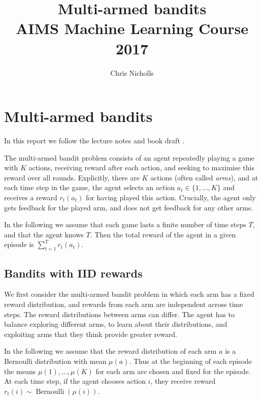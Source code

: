 \documentclass[10pt]{article}
\title{Multi-armed bandits \\ AIMS Machine Learning Course 2017}
\author{Chris Nicholls}
\DeclareMathOperator{\Bernoulli}{Bernoulli}
\begin{document}
\maketitle

\section{Multi-armed bandits}
In this report we follow the lecture notes \cite{Kanade} and book draft
\cite{Slivkins}.

The multi-armed bandit problem consists of an agent repeatedly playing a game
with $K$ actions, receiving reward after each action, and seeking to maximise
this reward over all rounds. Explicitly, there are $K$ actions (often called
\emph{arms}), and at each time step in the game, the agent selects an action
$a_t \in \{1, \ldots, K\}$ and receives a reward $r_t(a_t)$ for having played
this action. Crucially, the agent only gets feedback for the played arm, and
does not get feedback for any other arms.

In the following we assume that each game lasts a finite number of time steps
$T$, and that the agent knows $T$. Then the total reward of the agent in a given
episode is $\sum_{t=1}^T r_t(a_t)$.

\subsection{Bandits with IID rewards}
We first consider the multi-armed bandit problem in which each arm has a fixed
reward distribution, and rewards from each arm are independent across time
steps. The reward distributions between arms can differ. The agent has to
balance exploring different arms, to learn about their distributions, and
exploiting arms that they think provide greater reward.

In the following we assume that the reward distribution of each arm $a$ is a
Bernoulli distribution with mean $\mu(a)$. Thus at the beginning of each episode
the means $\mu(1), \ldots, \mu(K)$ for each arm are chosen and fixed for the
episode. At each time step, if the agent chooses action $i$, they receive reward
$r_t(i) \sim \Bernoulli(\mu(i))$.
\end{document}
